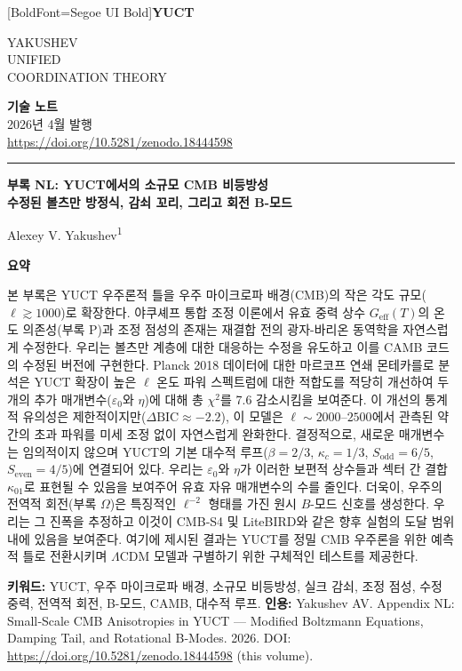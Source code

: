 \documentclass[11pt,a4paper]{article}
\newcommand{\makeheader}{%
	\noindent
	\begin{minipage}{0.17\textwidth}
		\raggedright
		{\fontspec{Segoe UI}[BoldFont=Segoe UI Bold]\bfseries\color{skyblue}\fontsize{46}{46}\selectfont YUCT}%
	\end{minipage}%
	\hspace{30pt}
	\begin{minipage}{0.32\textwidth}
		\raggedright
		{\sffamily\fontsize{11}{13}\selectfont YAKUSHEV\\ UNIFIED\\ COORDINATION THEORY}%
	\end{minipage}%
	\hfill
	\begin{minipage}{0.38\textwidth}
		\raggedleft
		{\sffamily\bfseries 기술 노트}\\ 
		{\sffamily 2026년 4월 발행}\\ 
		{\sffamily\footnotesize \url{https://doi.org/10.5281/zenodo.18444598}}%
	\end{minipage}
	\par\vspace{5pt}
	\noindent\textcolor{gold}{\rule{\textwidth}{1.6pt}}
	\par\vspace{0pt}
}
\begin{document}
	\thispagestyle{firstpage}
	\makeheader
	
	\vspace{0cm}
	{\LARGE\bfseries 부록 NL: YUCT에서의 소규모 CMB 비등방성 \\ 
		\Large 수정된 볼츠만 방정식, 감쇠 꼬리, 그리고 회전 B-모드 \par}
	\vspace{0.2cm}
	
	{\large Alexey V. Yakushev\textsuperscript{1}} \\
	\vspace{0.0cm}
	
	{\color{darkblue}\textbf{\LARGE 요약}} \par
	{\large
		\noindent
		본 부록은 YUCT 우주론적 틀을 우주 마이크로파 배경(CMB)의 작은 각도 규모($\ell \gtrsim 1000$)로 확장한다. 야쿠셰프 통합 조정 이론에서 유효 중력 상수 $G_{\mathrm{eff}}(T)$의 온도 의존성(부록 P)과 조정 점성의 존재는 재결합 전의 광자-바리온 동역학을 자연스럽게 수정한다. 우리는 볼츠만 계층에 대한 대응하는 수정을 유도하고 이를 CAMB 코드의 수정된 버전에 구현한다. Planck 2018 데이터에 대한 마르코프 연쇄 몬테카를로 분석은 YUCT 확장이 높은 $\ell$ 온도 파워 스펙트럼에 대한 적합도를 적당히 개선하여 두 개의 추가 매개변수($\varepsilon_0$와 $\eta$)에 대해 총 $\chi^2$를 7.6 감소시킴을 보여준다. 이 개선의 통계적 유의성은 제한적이지만($\Delta\mathrm{BIC} \approx -2.2$), 이 모델은 $\ell \sim 2000$--$2500$에서 관측된 약간의 초과 파워를 미세 조정 없이 자연스럽게 완화한다. 결정적으로, 새로운 매개변수는 임의적이지 않으며 YUCT의 기본 대수적 루프($\beta=2/3$, $\kappa_c=1/3$, $S_{\mathrm{odd}}=6/5$, $S_{\mathrm{even}}=4/5$)에 연결되어 있다. 우리는 $\varepsilon_0$와 $\eta$가 이러한 보편적 상수들과 섹터 간 결합 $\kappa_{01}$로 표현될 수 있음을 보여주어 유효 자유 매개변수의 수를 줄인다. 더욱이, 우주의 전역적 회전(부록 $\Omega$)은 특징적인 $\ell^{-2}$ 형태를 가진 원시 $B$-모드 신호를 생성한다. 우리는 그 진폭을 추정하고 이것이 CMB‑S4 및 LiteBIRD와 같은 향후 실험의 도달 범위 내에 있음을 보여준다. 여기에 제시된 결과는 YUCT를 정밀 CMB 우주론을 위한 예측적 틀로 전환시키며 $\Lambda$CDM 모델과 구별하기 위한 구체적인 테스트를 제공한다.
	}
	
	\vspace{0.1cm}
	\noindent
	{\color{darkblue}\textbf{키워드:}} YUCT, 우주 마이크로파 배경, 소규모 비등방성, 실크 감쇠, 조정 점성, 수정 중력, 전역적 회전, B-모드, CAMB, 대수적 루프.
	\vspace{0.1cm}
	\noindent
	{\color{darkblue}\textbf{인용:}} Yakushev AV. Appendix NL: Small‑Scale CMB Anisotropies in YUCT — Modified Boltzmann Equations, Damping Tail, and Rotational B‑Modes. 2026. DOI: \url{https://doi.org/10.5281/zenodo.18444598} (this volume).
	
\end{document}
